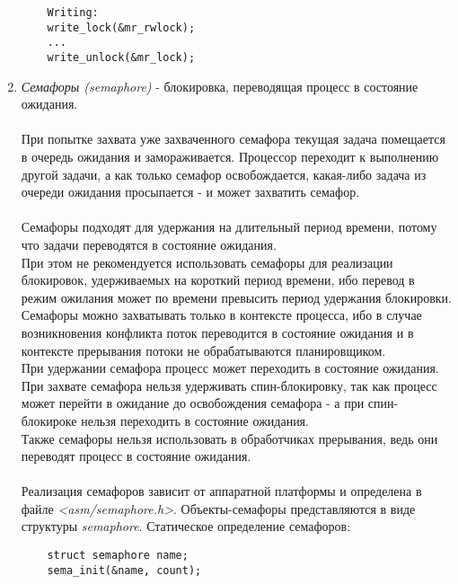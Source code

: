 \begin{enumerate}
\begin{lstlisting}
    Writing:
    write_lock(&mr_rwlock);
    ...
    write_unlock(&mr_lock);
    \end{lstlisting}
    \item \textit{Семафоры (semaphore)} - блокировка, переводящая процесс в состояние ожидания.
    \\\\
    При попытке захвата уже захваченного семафора текущая задача помещается в очередь ожидания и замораживается. Процессор переходит к выполнению другой задачи, а как только семафор освобождается, какая-либо задача из очереди ожидания просыпается - и может захватить семафор.
    \\\\ 
    Семафоры подходят для удержания на длительный период времени, потому что задачи переводятся в состояние ожидания. \\При этом не рекомендуется использовать семафоры для реализации блокировок, удерживаемых на короткий период времени, ибо перевод в режим ожилания может по времени превысить период удержания блокировки. \\Семафоры можно захватывать только в контексте процесса, ибо в случае возникновения конфликта поток переводится в состояние ожидания и в контексте прерывания потоки не обрабатываются планировщиком. \\При удержании семафора процесс может переходить в состояние ожидания.\\При захвате семафора нельзя удерживать спин-блокировку, так как процесс может перейти в ожидание до освобождения семафора - а при спин-блокироке нельзя переходить в состояние ожидания.\\Также семафоры нельзя использовать в обработчиках прерывания, ведь они переводят процесс в состояние ожидания.
    \\\\
    Реализация семафоров зависит от аппаратной платформы и определена в файле \textit{<asm/semaphore.h>}. Объекты-семафоры представляются в виде структуры \textit{semaphore}. Статическое определение семафоров:
    
    \begin{lstlisting}
    struct semaphore name;
    sema_init(&name, count);
    \end{lstlisting}
    

\end{enumerate}
